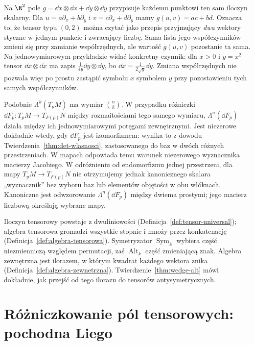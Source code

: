 \begin{przyklad}
Na $\R^2$ pole
$g=\dd x\otimes\dd x+\dd y\otimes\dd y$
przypisuje każdemu punktowi ten sam iloczyn skalarny.
Dla $u=a\partial_x+b\partial_y$ i
$v=c\partial_x+d\partial_y$ mamy
$g(u,v)=ac+bd$. Oznacza to, że tensor typu $(0,2)$
można czytać jako przepis przyjmujący \emph{dwa}
wektory styczne w jednym punkcie i zwracający liczbę.
Sama lista jego współczynników zmieni się przy zamianie
współrzędnych, ale wartość $g(u,v)$ pozostanie ta sama.
Na jednowymiarowym przykładzie widać konkretny czynnik:
dla $x>0$ i $y=x^2$ tensor $\dd x\otimes\dd x$ ma zapis
$\frac1{4y}\dd y\otimes\dd y$, bo
$\dd x=\frac1{2\sqrt y}\dd y$. Zmiana współrzędnych nie
pozwala więc po prostu zastąpić symbolu $x$ symbolem $y$
przy pozostawieniu tych samych współczynników.
\end{przyklad}

Podobnie $\Lambda^k(T_pM)$ ma wymiar $\binom nk$.
W przypadku różniczki $\dd F_p\colon T_pM\to T_{F(p)}N$
między rozmaitościami tego samego wymiaru,
$\Lambda^n(\dd F_p)$ działa między ich jednowymiarowymi
potęgami zewnętrznymi. Jest niezerowe dokładnie wtedy,
gdy $\dd F_p$ jest izomorfizmem: wynika to z dowodu
Twierdzenia~\ref{thm:det-wlasnosci}, zastosowanego do baz
w dwóch różnych przestrzeniach. W mapach odpowiada temu
warunek niezerowego wyznacznika macierzy Jacobiego.
W odróżnieniu od endomorfizmu jednej przestrzeni, dla mapy
$T_pM\to T_{F(p)}N$ nie otrzymujemy jednak kanonicznego skalara
„wyznacznik” bez wyboru baz lub elementów objętości w obu włóknach.
Kanoniczne jest odwzorowanie $\Lambda^n(\dd F_p)$ między
dwiema prostymi; jego macierz liczbową określają wybrane mapy.

\begin{uwaga}
Iloczyn tensorowy powstaje z dwuliniowości
(Definicja~\ref{def:tensor-universal}); algebra tensorowa
gromadzi wszystkie stopnie i mnoży przez konkatenację
(Definicja~\ref{def:algebra-tensorowa}). Symetryzator
$\operatorname{Sym}_k$ wybiera część niezmienniczą względem
permutacji, zaś $\operatorname{Alt}_k$ część zmieniającą znak.
Algebra zewnętrzna jest ilorazem, w którym kwadrat każdego
wektora znika (Definicja~\ref{def:algebra-zewnetrzna}).
Twierdzenie~\ref{thm:wedge-alt} mówi dokładnie, jak przejść
od tego ilorazu do tensorów antysymetrycznych.
\end{uwaga}

\section{Różniczkowanie pól tensorowych: pochodna Liego}
\label{sec:lie-tensory}

